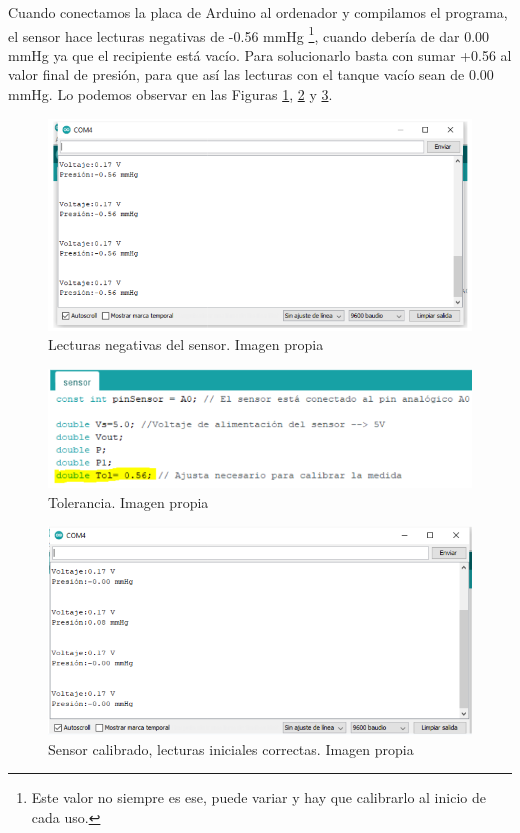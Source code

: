Cuando conectamos la placa de Arduino al ordenador y compilamos el programa, el sensor hace lecturas negativas de -0.56 mmHg \footnote{Este valor no siempre es ese, puede variar y hay que calibrarlo al inicio de cada uso.}, cuando debería de dar 0.00 mmHg ya que el recipiente está vacío. Para solucionarlo basta con sumar +0.56 al valor final de presión, para que así las lecturas con el tanque vacío sean de 0.00 mmHg. Lo podemos observar en las Figuras \ref{fig:lect-neg}, \ref{fig:tol} y \ref{fig:lectcero}.
\begin{figure}[H]
    \centering
    \includegraphics[width=1\textwidth]{img/lecturasnegativas.PNG}
    \caption{Lecturas negativas del sensor. Imagen propia}
    \label{fig:lect-neg}
\end{figure}

\begin{figure}[H]
    \centering
    \includegraphics[width=1\textwidth]{img/tol.PNG}
    \caption{Tolerancia. Imagen propia}
    \label{fig:tol}
\end{figure}

\begin{figure}[H]
    \centering
    \includegraphics[width=1\textwidth]{img/lectcero.PNG}
    \caption{Sensor calibrado, lecturas iniciales correctas. Imagen propia}
    \label{fig:lectcero}
\end{figure}

